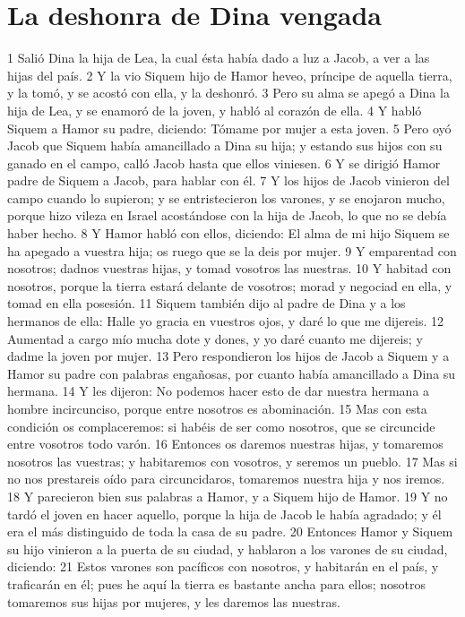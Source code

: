 \section*{La deshonra de Dina vengada}

1 Salió Dina la hija de Lea, la cual ésta había dado a luz a Jacob, a ver a las hijas del país.
2 Y la vio Siquem hijo de Hamor heveo, príncipe de aquella tierra, y la tomó, y se acostó con ella, y la deshonró.
3 Pero su alma se apegó a Dina la hija de Lea, y se enamoró de la joven, y habló al corazón de ella.
4 Y habló Siquem a Hamor su padre, diciendo: Tómame por mujer a esta joven.
5 Pero oyó Jacob que Siquem había amancillado a Dina su hija; y estando sus hijos con su ganado en el campo, calló Jacob hasta que ellos viniesen.
6 Y se dirigió Hamor padre de Siquem a Jacob, para hablar con él.
7 Y los hijos de Jacob vinieron del campo cuando lo supieron; y se entristecieron los varones, y se enojaron mucho, porque hizo vileza en Israel acostándose con la hija de Jacob, lo que no se debía haber hecho.
8 Y Hamor habló con ellos, diciendo: El alma de mi hijo Siquem se ha apegado a vuestra hija; os ruego que se la deis por mujer.
9 Y emparentad con nosotros; dadnos vuestras hijas, y tomad vosotros las nuestras.
10 Y habitad con nosotros, porque la tierra estará delante de vosotros; morad y negociad en ella, y tomad en ella posesión.
11 Siquem también dijo al padre de Dina y a los hermanos de ella: Halle yo gracia en vuestros ojos, y daré lo que me dijereis.
12 Aumentad a cargo mío mucha dote y dones, y yo daré cuanto me dijereis; y dadme la joven por mujer.
13 Pero respondieron los hijos de Jacob a Siquem y a Hamor su padre con palabras engañosas, por cuanto había amancillado a Dina su hermana.
14 Y les dijeron: No podemos hacer esto de dar nuestra hermana a hombre incircunciso, porque entre nosotros es abominación.
15 Mas con esta condición os complaceremos: si habéis de ser como nosotros, que se circuncide entre vosotros todo varón.
16 Entonces os daremos nuestras hijas, y tomaremos nosotros las vuestras; y habitaremos con vosotros, y seremos un pueblo.
17 Mas si no nos prestareis oído para circuncidaros, tomaremos nuestra hija y nos iremos.
18 Y parecieron bien sus palabras a Hamor, y a Siquem hijo de Hamor.
19 Y no tardó el joven en hacer aquello, porque la hija de Jacob le había agradado; y él era el más distinguido de toda la casa de su padre.
20 Entonces Hamor y Siquem su hijo vinieron a la puerta de su ciudad, y hablaron a los varones de su ciudad, diciendo:
21 Estos varones son pacíficos con nosotros, y habitarán en el país, y traficarán en él; pues he aquí la tierra es bastante ancha para ellos; nosotros tomaremos sus hijas por mujeres, y les daremos las nuestras.
